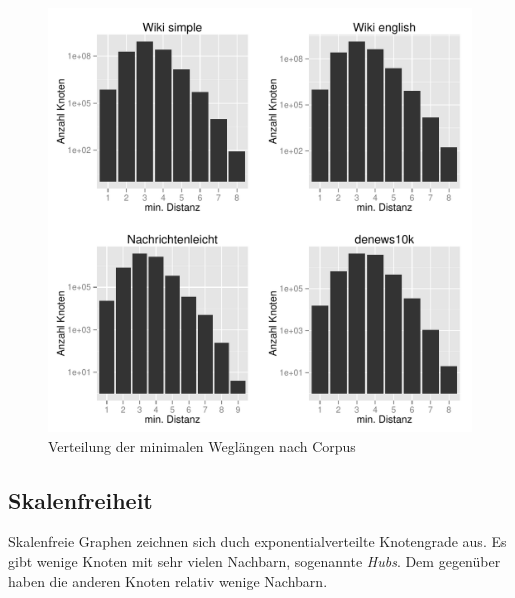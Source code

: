 \documentclass[11pt, a4paper]{article}
\begin{document}
\begin{figure}[ht]
    \centering
        \includegraphics[scale=.75]{mdh_plots.pdf}
    \caption{Verteilung der minimalen Weglängen nach Corpus}
    \label{fig-mdh}
\end{figure}

\subsection{Skalenfreiheit}
Skalenfreie Graphen zeichnen sich duch exponentialverteilte Knotengrade aus.
Es gibt wenige Knoten mit sehr vielen Nachbarn, sogenannte \emph{Hubs}.
Dem gegenüber haben die anderen Knoten relativ wenige Nachbarn. 

\end{document}
